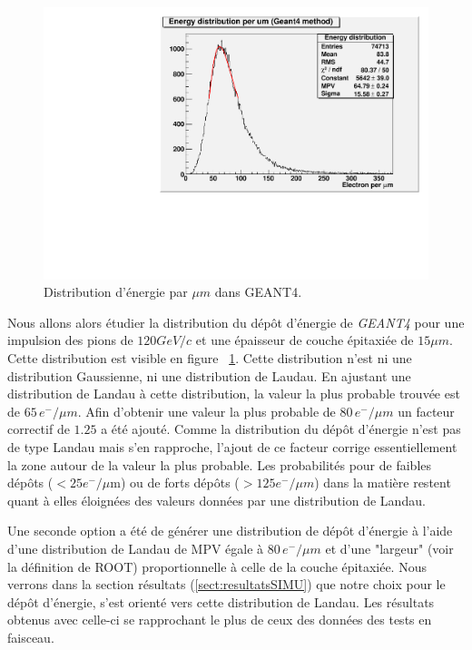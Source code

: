    \begin{figure}[!htb]
    \begin{center} 
     \includegraphics[scale=0.60]{./figures/energy_distrib_Geant4_3.pdf}
     \caption{\label{fig:distribEnergie} Distribution d'énergie par $\mu m$ dans GEANT4.}
    \end{center}
   \end{figure}

   \medskip
   
    Nous allons alors \'etudier la distribution du d\'epôt d'\'energie de \textit{GEANT4} pour une impulsion des pions de $120 GeV/c$ et une \'epaisseur de couche épitaxiée de $15 \mu m$. Cette distribution est visible en figure ~\ref{fig:distribEnergie}. Cette distribution n'est ni une distribution Gaussienne, ni une distribution de Laudau. En ajustant une distribution de Landau \`a cette distribution, la valeur la plus probable trouv\'ee est de $65 \, e^-/\mu m$. Afin d'obtenir une valeur la plus probable de $80 \, e^-/\mu m$ un facteur correctif de $1.25$ a \'et\'e ajout\'e. Comme la distribution du d\'epôt d'énergie n'est pas de type Landau mais s'en rapproche, l'ajout de ce facteur corrige essentiellement la zone autour de la valeur la plus probable. Les probabilit\'es pour de faibles d\'ep\^ots ($< 25 e^-/ \mu $m) ou de forts d\'ep\^ots ($> 125 e^-/ \mu m$) dans la mati\`ere restent quant \`a elles \'eloign\'ees des valeurs donn\'ees par une distribution de Landau.
    
    \medskip
    
    Une seconde option a \'et\'e de générer une distribution de dépôt d'\'energie \`a l'aide d'une distribution de Landau de MPV \'egale \`a $80 \, e^-/\mu m$ et d'une "largeur" (voir la d\'efinition de ROOT) proportionnelle \`a celle de la couche épitaxiée. Nous verrons dans la section résultats (\ref{sect:resultatsSIMU}) que notre choix pour le d\'epôt d'\'energie, s'est orient\'e vers cette distribution de Landau. Les r\'esultats obtenus avec celle-ci se rapprochant le plus de ceux des donn\'ees des tests en faisceau. 
   
